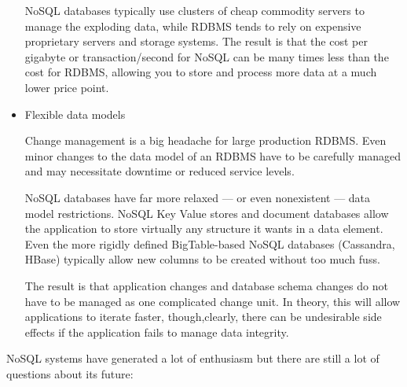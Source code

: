 \begin{itemize}
NoSQL databases typically use clusters of cheap commodity servers to manage the exploding data, while RDBMS tends to rely on expensive proprietary servers and storage systems. The result is that the cost per gigabyte or transaction/second for NoSQL can be many times less than the cost for RDBMS, allowing you to store and process more data at a much lower price point.


\item Flexible data models

Change management is a big headache for large production RDBMS. Even minor changes to the data model of an RDBMS have to be carefully managed and may necessitate downtime or reduced service levels.

NoSQL databases have far more relaxed — or even nonexistent — data model restrictions. NoSQL Key Value stores and document databases allow the application to store virtually any structure it wants in a data element. Even the more rigidly defined BigTable-based NoSQL databases (Cassandra, HBase) typically allow new columns to be created without too much fuss.

The result is that application changes and database schema changes do not have to be managed as one complicated change unit. In theory, this will allow applications to iterate faster, though,clearly, there can be undesirable side effects if the application fails to manage data integrity.

\end{itemize}


NoSQL systems have generated a lot of enthusiasm but there are still a lot of questions about its future:

